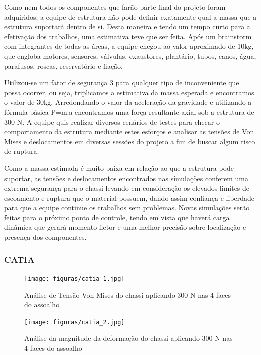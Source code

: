 Como nem todos os componentes que farão parte final do projeto foram adquiridos, a equipe de estrutura não pode definir exatamente qual a massa que a estrutura suportará dentro de si. Desta maneira e tendo um tempo curto para a efetivação dos trabalhos, uma estimativa teve que ser feita. Após um brainstorm com integrantes de todas as áreas, a equipe chegou ao valor aproximado de 10kg, que engloba motores, sensores, válvulas, exaustores, plantário, tubos, canos, água, parafusos, roscas, reservatório e fiação.

Utilizou-se um fator de segurança 3 para qualquer tipo de inconveniente que possa ocorrer, ou seja, triplicamos a estimativa da massa esperada e encontramos o valor de 30kg. Arredondando o valor da aceleração da gravidade e utilizando a fórmula básica P=m.a encontramos uma força resultante axial sob a estrutura de 300 N. A equipe quis realizar diversos cenários de testes para checar o comportamento da estrutura mediante estes esforços e analisar as tensões de Von Mises e deslocamentos em diversas sessões do projeto a fim de buscar algum risco de ruptura. 

Como a massa estimada é muito baixa em relação ao que a estrutura pode suportar, as tensões e deslocamentos encontrados nas simulações conferem uma extrema segurança para o chassi levando em consideração os elevados limites de escoamento e ruptura que o material possuem, dando assim confiança e liberdade para que a equipe continue os trabalhos sem problemas.
Novas simulações serão feitas para o próximo ponto de controle, tendo em vista que haverá carga dinâmica que gerará momento fletor e uma melhor precisão sobre localização e presença dos componentes.

\subsubsection{CATIA}

\begin{figure}[H]
	\centering
	\texttt{[image: figuras/catia\_1.jpg]}
	\caption{Análise de Tensão Von Mises do chassi aplicando 300 N nas 4 faces do assoalho} 
	\label{catia_1}
\end{figure}

\begin{figure}[H]
	\centering
	\texttt{[image: figuras/catia\_2.jpg]}
	\caption{Análise da magnitude da deformação do chassi aplicando 300 N nas 4 faces do assoalho} 
	\label{catia_2}
\end{figure}


